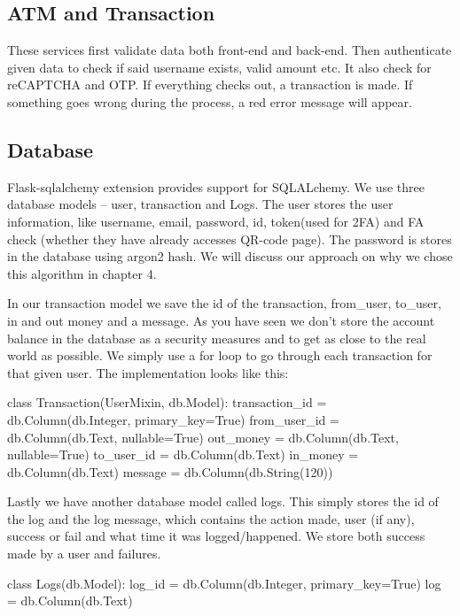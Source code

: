 \subsection{ATM and Transaction}

These services first validate data both front-end and back-end. Then authenticate given data to check if said username exists, valid amount etc. It also check for reCAPTCHA and OTP. If everything checks out, a transaction is made. If something goes wrong during the process, a red error message will appear. 

\subsection{Database}

Flask-sqlalchemy extension provides support for SQLALchemy. We use three database models – user, transaction and Logs. The user stores the user information, like username, email, password, id, token(used for 2FA) and FA check (whether they have already accesses QR-code page). The password is stores in the database using argon2 hash. We will discuss our approach on why we chose this algorithm in chapter 4. 

In our transaction model we save the id of the transaction, from\_user, to\_user, in and out money and a message. As you have seen we don’t store the account balance in the database as a security measures and to get as close to the real world as possible. We simply use a for loop to go through each transaction for that given user. The implementation looks like this:

\begin{python}
class Transaction(UserMixin, db.Model):
   transaction_id = db.Column(db.Integer, primary_key=True)
   from_user_id = db.Column(db.Text, nullable=True)  
   out_money = db.Column(db.Text, nullable=True)
   to_user_id = db.Column(db.Text) 
   in_money = db.Column(db.Text)
   message = db.Column(db.String(120))
\end{python}

Lastly we have another database model called logs. This simply stores the id of the log and the log message, which contains the action made, user (if any), success or fail and what time it was logged/happened. We store both success made by a user and failures. 

\begin{python}
class Logs(db.Model):
    log_id = db.Column(db.Integer, primary_key=True)
    log = db.Column(db.Text)
\end{python}